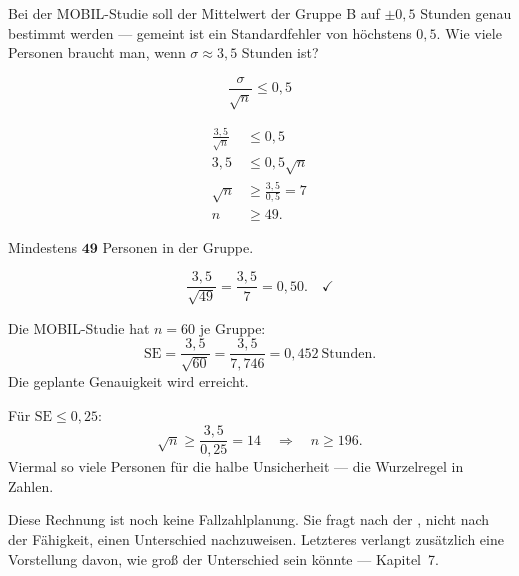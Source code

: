\begin{aufgabe}
Bei der MOBIL-Studie soll der Mittelwert der Gruppe B auf $\pm 0{,}5$ Stunden genau bestimmt werden --- gemeint ist ein Standardfehler von höchstens $0{,}5$. Wie viele Personen braucht man, wenn $\sigma \approx 3{,}5$ Stunden ist?

\loesung
{}
\[ \frac{\sigma}{\sqrt n} \le 0{,}5 \]

\begin{align*}
\frac{3{,}5}{\sqrt n} &\le 0{,}5\\
3{,}5 &\le 0{,}5\sqrt n\\
\sqrt n &\ge \frac{3{,}5}{0{,}5} = 7\\
n &\ge 49 .
\end{align*}

Mindestens $\mathbf{49}$ Personen in der Gruppe.

\[ \frac{3{,}5}{\sqrt{49}} = \frac{3{,}5}{7} = 0{,}50 . \quad \checkmark \]

Die MOBIL-Studie hat $n = 60$ je Gruppe:
\[ \mathrm{SE} = \frac{3{,}5}{\sqrt{60}} = \frac{3{,}5}{7{,}746} = 0{,}452 \ \text{Stunden} . \]
Die geplante Genauigkeit wird erreicht. \checkmark

Für $\mathrm{SE} \le 0{,}25$:
\[ \sqrt n \ge \frac{3{,}5}{0{,}25} = 14 \quad\Longrightarrow\quad n \ge 196 . \]
Viermal so viele Personen für die halbe Unsicherheit --- die Wurzelregel in Zahlen.

Diese Rechnung ist noch keine Fallzahlplanung. Sie fragt nach der , nicht nach der Fähigkeit, einen Unterschied nachzuweisen. Letzteres verlangt zusätzlich eine Vorstellung davon, wie groß der Unterschied sein könnte --- Kapitel~7.
\end{aufgabe}

